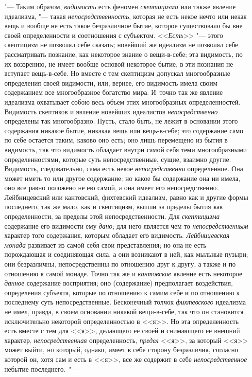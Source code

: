 "--- Таким образом, {\em видимость} есть феномен
{\em скептицизма} или также явление идеализма, "--- такая
{\em непосредственность}, которая не есть некое нечто
или некая вещь и вообще не есть такое безразличное бытие, которое
существовало бы вне своей определенности и соотношения с субъектом.
<<{\em Есть}>> "--- этого скептицизм не позволял себе
сказать; новейший же идеализм не позволял себе рассматривать познание, как
некоторое знание о вещи-в-себе; эта видимость, по их воззрению, не имеет
вообще основой некоторое бытие, в эти познания не вступает вещь-в-себе. Но
вместе с тем скептицизм допускал многообразные определения своей видимости,
или, вернее, его видимость имела своим содержанием все многообразное
богатство мира. И~точно так же явление идеализма охватывает собою весь
объем этих многообразных определенностей. Видимость скептиков и явление
новейших идеалистов {\em непосредственно} определены
так многообразно. Пусть, стало быть, не лежит в основании этого содержания
никакое бытие, никакая вещь или вещь-в-себе; это содержание само по себе
остается таким, каково оно есть; оно лишь перемещено из бытия в видимость,
так что видимость обладает внутри самой себя теми многообразными
определенностями, которые суть непосредственные, сущие, взаимно другие.
Видимость, следовательно, сама есть некое
{\em непосредственно} определенное. Она может иметь то
или другое содержание; но какое бы содержание она ни имела, оно все равно
положено не ею самой, а она имеет его непосредственно. Лейбницевский или
кантовский, фихтевский идеализм, равно как и другие формы последнего, так
же мало, как и скептицизм, вышли за пределы бытия как определенности, за
пределы этой непосредственности. Для {\em скептицизма}
содержание его видимости ему {\em дано}; для него
является чем-то {\em непосредственным} характер того
содержания, которым обладает его видимость.
{\em Лейбницевская монада} развивает из самой себя свои
представления; но она не есть порождающая и соединяющая сила, а они
возникают в ней, как мыльные пузыри; они безразличны, непосредственны по
отношению друг к другу, а также и по отношению к самой монаде. Точно так же
и {\em кантовское} явление есть некоторое
{\em данное} содержание восприятия; оно (содержание)
предполагает воздействия, определения субъекта, которые по отношению к
самим себе и по отношению к последнему суть непосредственные. Бесконечный
толчок
{\em фихтевского} идеализма не имел, правда, в своем
основании никакой вещи-в-себе, так что он становится исключительно
некоторой определенностью в <<я>>. Но эта определенность есть вместе с тем
для <<я>>, делающего ее своей и снимающего ее внешний характер,
{\em непосредственная} определенность,
{\em предел} <<я>>, за который <<я>> может выйти, но
который, однако, имеет в себе сторону безразличия, согласно которой он,
хотя сам и есть в <<я>>, все же содержит в себе
{\em непосредственное} небытие последнего.~"---

